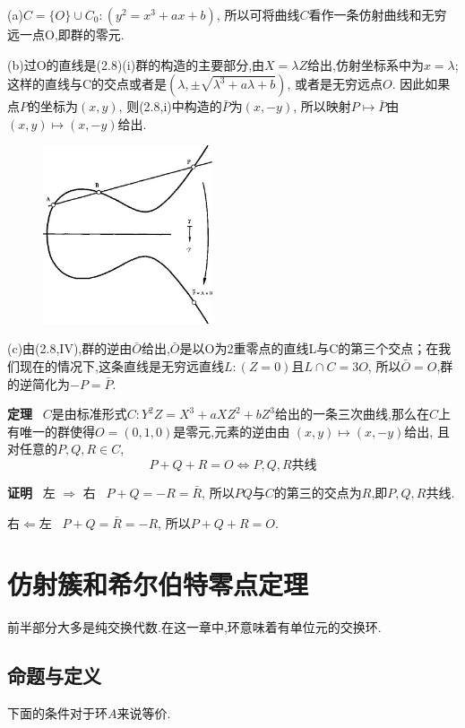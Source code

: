 \documentclass[UTF8]{book}
\begin{document}
		(a)$C=\{O\}\cup C_{0}:(y^{2}=x^{3}+ax+b)$, 所以可将曲线$ C $看作一条仿射曲线和无穷远一点O,即群的零元.
		
		(b)过O的直线是(2.8)(i)群的构造的主要部分,由$X=\lambda Z$给出,仿射坐标系中为$x=\lambda$; 这样的直线与C的交点或者是$(\lambda,\pm \sqrt{\lambda^{3}+a\lambda+b})$, 或者是无穷远点$ O $. 因此如果点$ P $的坐标为$ (x,y) $, 则(2.8,i)中构造的$\bar{P}$为$ (x,-y) $, 所以映射$P\mapsto\bar{P}$由 $(x,y)\mapsto(x,-y)$给出.
		
		\begin{figure}[h]
		  \centering
		  \includegraphics[width=5cm]{39.jpg}\\
		\end{figure}
	
	
	
		(c)由(2.8,IV),群的逆由$\bar{O}$给出,$\bar{O}$是以O为2重零点的直线L与C的第三个交点；在我们现在的情况下,这条直线是无穷远直线$ L:(Z=0) $且$L\cap C=3O$, 所以$\bar{O}=O$,群的逆简化为$-P=\bar{P}$.
		
		
		\textbf{定理} \ 
		$ C $是由标准形式$C:Y^{2}Z=X^{3}+aXZ^{2}+bZ^{3}$给出的一条三次曲线,那么在$ C $上有唯一的群使得$ O=(0,1,0) $是零元,元素的逆由由 $(x,y)\mapsto(x,-y)$给出, 且对任意的$P,Q,R\in C$,
		\begin{equation*}
			P+Q+R=O \Longleftrightarrow P,Q,R\text{共线}
		\end{equation*}
		
		
		\justifying	
		\textbf{证明} \ 左 $\Rightarrow$ 右 \   $P+Q=-R=\bar{R}$, 所以$ PQ $与$ C $的第三的交点为$ R $,即$ P,Q,R $共线.
		
		右$\Leftarrow$左 \ $P+Q=\bar{R}=-R$, 所以$ P+Q+R=O $.

		
		
\chapter{仿射簇和希尔伯特零点定理}
	前半部分大多是纯交换代数.在这一章中,环意味着有单位元的交换环.
	\section{命题与定义}
		下面的条件对于环$ A $来说等价.
		
\end{document}
